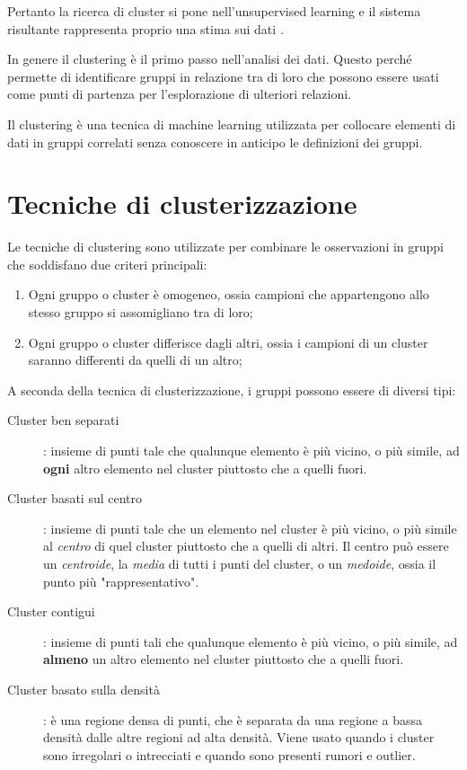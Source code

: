 Pertanto la ricerca di cluster si pone nell'unsupervised learning e il sistema risultante rappresenta proprio una stima sui dati \cite{geron2022hands}. 

In genere il clustering è il primo passo nell'analisi dei dati. Questo perché permette di identificare gruppi in relazione tra di loro che possono essere usati come punti di partenza per l'esplorazione di ulteriori relazioni.

Il clustering è una tecnica di machine learning utilizzata per collocare elementi di dati in gruppi correlati senza conoscere in anticipo le definizioni dei gruppi.

\section{Tecniche di clusterizzazione}

Le tecniche di clustering sono utilizzate per combinare le osservazioni in gruppi che soddisfano due criteri principali:
\begin{enumerate}
	\item Ogni gruppo o cluster è omogeneo, ossia campioni che appartengono allo stesso gruppo si assomigliano tra di loro;
	\item Ogni gruppo o cluster differisce dagli altri, ossia i campioni di un cluster saranno differenti da quelli di un altro;
\end{enumerate}

A seconda della tecnica di clusterizzazione, i gruppi possono essere di diversi tipi:
\begin{description}
	\item[Cluster ben separati]: insieme di punti tale che qualunque elemento è più vicino, o più simile, ad \textbf{ogni} altro elemento nel cluster piuttosto che a quelli fuori.
	\item[Cluster basati sul centro]: insieme di punti tale che un elemento nel cluster è più vicino, o più simile al \textit{centro} di quel cluster piuttosto che a quelli di altri. Il centro può essere un \textit{centroide}, la \textit{media} di tutti i punti del cluster, o un \textit{medoide}, ossia il punto più "rappresentativo".
	\item[Cluster contigui]: insieme di punti tali che qualunque elemento è più vicino, o più simile, ad \textbf{almeno} un altro elemento nel cluster piuttosto che a quelli fuori.
	\item[Cluster basato sulla densità]: è una regione densa di punti, che è separata da una regione a bassa densità dalle altre regioni ad alta densità. Viene usato quando i cluster sono irregolari o intrecciati e quando sono presenti rumori e outlier.
\end{description}


